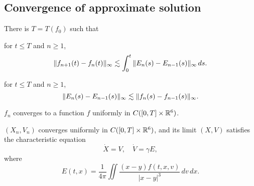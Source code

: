 \documentclass[11pt]{amsart}
\begin{document}
\subsection{Convergence of approximate solution}
\begin{lem}
There is $T=T(f_0)$ such that
\begin{cond}
\item
for $t\le T$ and $n\ge1$,
\[\|f_{n+1}(t)-f_n(t)\|_\infty\lesssim\int_0^t\|E_n(s)-E_{n-1}(s)\|_\infty\,ds.\]
\item
for $t\le T$ and $n\ge1$,
\[\|E_n(s)-E_{n-1}(s)\|_\infty\lesssim\|f_n(s)-f_{n-1}(s)\|_\infty.\]
\item $f_n$ converges to a function $f$ uniformly in $C([0,T]\times\mathbb{R}^6)$.
\item $(X_n,V_n)$ converges uniformly in $C([0,T]\times\mathbb{R}^6)$, and its limit $(X,V)$ satisfies the characteristic equation
\[\dot X=V,\quad\dot V=\gamma E,\]
where
\[E(t,x)=\frac1{4\pi}\iint\frac{(x-y)f(t,x,v)}{|x-y|^3}\,dv\,dx.\]
\end{cond}
\end{lem}
\end{document}
